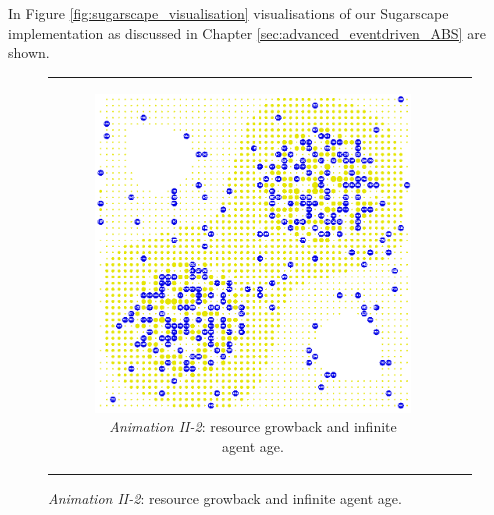 In Figure \ref{fig:sugarscape_visualisation} visualisations of our Sugarscape implementation as discussed in Chapter \ref{sec:advanced_eventdriven_ABS} are shown.

\begin{figure}[H]
\begin{center}
	\begin{tabular}{c c}
		\begin{subfigure}[b]{0.4\textwidth}
			\centering
			\includegraphics[width=1\textwidth, angle=0]{./fig/background/abs/sugarscape_normal.png}
			\caption{\textit{Animation II-2}: resource growback and infinite agent age.}
			\label{fig:sugarscape_visualisation_normal}
		\end{subfigure}
		
		&
    	

\end{tabular}
\end{center}
\end{figure}

